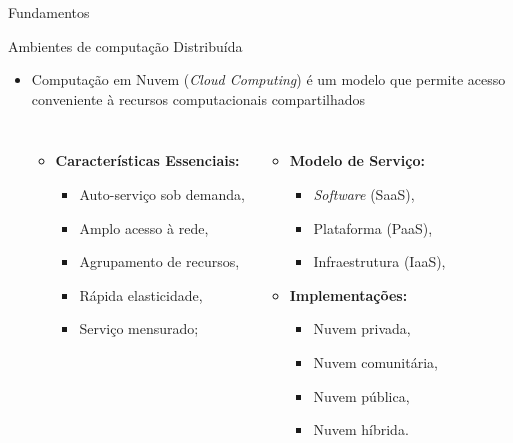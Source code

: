 \documentclass[aspectratio=43,10pt]{beamer}
\newcommand{\nota}[1]{\hspace*{-0.5cm}\textit{{\color[rgb]{1,0,0}Nota: #1}}}
\begin{document}
\begin{frame}[fragile]{Fundamentos}
\begin{alertblock}{Ambientes de computação Distribuída}
\begin{itemize}
  \item Computação em Nuvem (\emph{Cloud Computing}) é um modelo que permite
  acesso conveniente à recursos computacionais compartilhados \cite{NIST2011}
  \begin{columns}[T,onlytextwidth]
    \begin{itemize}
      \item \textbf{Características Essenciais:}
      \begin{itemize}
        \item Auto-serviço sob demanda,
        \item Amplo acesso à rede,
        \item Agrupamento de recursos,
        \item Rápida elasticidade,
        \item Serviço mensurado;
      \end{itemize}
    \end{itemize}
    \begin{itemize}
      \item \textbf{Modelo de Serviço:}
      \begin{itemize}
        \item \emph{Software} (SaaS),
        \item Plataforma (PaaS),
        \item Infraestrutura (IaaS),
      \end{itemize}
      \item \textbf{Implementações:}
      \begin{itemize}
        \item Nuvem privada,
        \item Nuvem comunitária,
        \item Nuvem pública,
        \item Nuvem híbrida.
      \end{itemize}
    \end{itemize}
  \end{columns}
\end{itemize}
\end{alertblock}
\end{frame}
\end{document}
